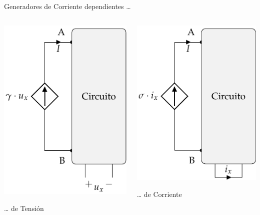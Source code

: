 \documentclass[xcolor={usenames,svgnames,dvipsnames}]{beamer}
\begin{document}
\begin{frame}[label={sec:org2d9b9e6}]{Generadores de Corriente dependientes \ldots{}}
\begin{columns}
\begin{column}{0.5\columnwidth}
 \begin{center}
\includegraphics[height=0.7\textheight]{figs/FuenteCorrienteDependienteTension.pdf}
\end{center}
\ldots{} de Tensión
\end{column}
\begin{column}{0.5\columnwidth}
 \begin{center}
\includegraphics[height=0.7\textheight]{figs/FuenteCorrienteDependienteCorriente.pdf}
\end{center}
\ldots{} de Corriente
\end{column}
\end{columns}
\end{frame}
\end{document}
